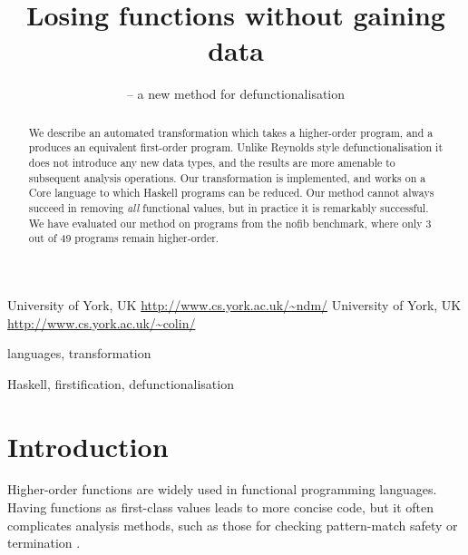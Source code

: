 \documentclass[preprint]{sigplanconf}
\begin{document}
\copyrightdata{[to be supplied]}

\titlebanner{\today{} - \currenttime{}}        %
\preprintfooter{}   %

\title{Losing functions without gaining data}
\subtitle{ -- a new method for defunctionalisation}

           {University of York, UK}
           {\url{http://www.cs.york.ac.uk/~ndm/}}
           {University of York, UK}
           {\url{http://www.cs.york.ac.uk/~colin/}}

\maketitle

\begin{abstract}
We describe an automated transformation which takes a higher-order program, and a produces an equivalent first-order program. Unlike Reynolds style defunctionalisation it does not introduce any new data types, and the results are more amenable to subsequent analysis operations. Our transformation is implemented, and works on a Core language to which Haskell programs can be reduced. Our method cannot always succeed in removing \textit{all} functional values, but in practice it is remarkably successful. We have evaluated our method on programs from the nofib benchmark, where only 3 out of 49 programs remain higher-order.
\end{abstract}


\terms
languages, transformation

\keywords
Haskell, firstification, defunctionalisation

\section{Introduction}

Higher-order functions are widely used in functional programming languages.  Having functions as first-class values leads to more concise code, but it often complicates analysis methods, such as those for checking pattern-match safety \cite{me:catch_icfp} or termination \cite{sereni:higher_order_termination}.
\end{document}
